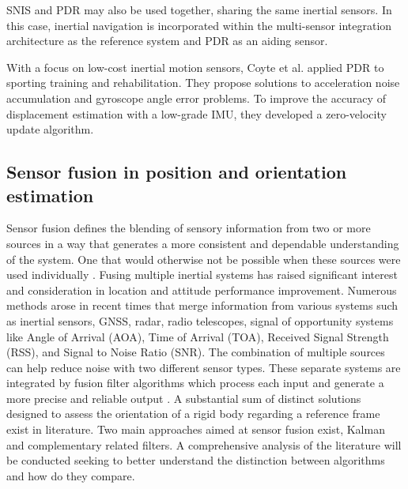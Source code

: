 SNIS and PDR may also be used together, sharing the same inertial sensors. In this case, inertial navigation is incorporated within the multi-sensor integration architecture as the reference system and PDR as an aiding sensor.


With a focus on low-cost inertial motion sensors, Coyte et al. \cite{coyte2013displacement} applied PDR to sporting training and rehabilitation. They propose solutions to acceleration noise accumulation and gyroscope angle error problems. To improve the accuracy of displacement estimation with a low-grade IMU, they developed a zero-velocity update algorithm.

\subsection{Sensor fusion in position and orientation estimation }
Sensor fusion defines the blending of sensory information from two or more sources in a way that generates a more consistent and dependable understanding of the system. One that would otherwise not be possible when these sources were used individually \cite{hall1997introduction}. Fusing multiple inertial systems has raised significant interest and consideration in location and attitude performance improvement. Numerous methods arose in recent times that merge information from various systems such as inertial sensors, GNSS, radar, radio telescopes, signal of opportunity systems like Angle of Arrival (AOA), Time of Arrival (TOA), Received Signal Strength (RSS), and Signal to Noise Ratio (SNR). The combination of multiple sources can help reduce noise with two different sensor types. These separate systems are integrated by fusion filter algorithms which process each input and generate a more precise and reliable output \cite{elmenreich2002introduction}. A substantial sum of distinct solutions designed to assess the orientation of a rigid body regarding a reference frame exist in literature. Two main approaches aimed at sensor fusion exist, Kalman and complementary related filters. A comprehensive analysis of the literature will be conducted seeking to better understand the distinction between algorithms and how do they compare.

